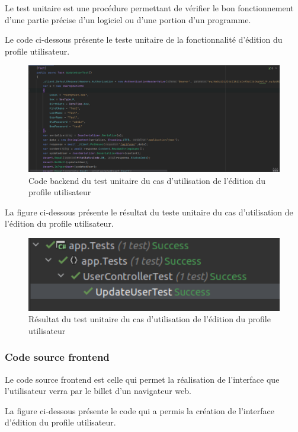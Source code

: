 Le test unitaire est une procédure permettant de vérifier le bon fonctionnement d'une partie précise d'un logiciel ou d'une portion d'un programme. 

Le code ci-dessous présente le teste unitaire de la fonctionnalité d'édition du profile utilisateur.

\begin{figure}[H]
	\centering
	\includegraphics[width=1\textwidth]{img/utupdate}
	\caption{Code backend du test unitaire du cas d'utilisation de l'édition du profile utilisateur}
	\label{fig:mesh1}
\end{figure}

La figure ci-dessous présente le résultat du teste unitaire du cas d'utilisation de l'édition du profile utilisateur.

\begin{figure}[H]
	\centering
	\includegraphics[width=1\textwidth]{img/uutr}
	\caption{Résultat du test unitaire du cas d'utilisation de l'édition du profile utilisateur}
	\label{fig:mesh1}
\end{figure}

\subsubsection{Code source frontend}

Le code source frontend est celle qui permet la réalisation de l'interface que l'utilisateur verra par le billet d'un navigateur web.

La figure ci-dessous présente le code qui a permis la création de l'interface d'édition du profile utilisateur.

